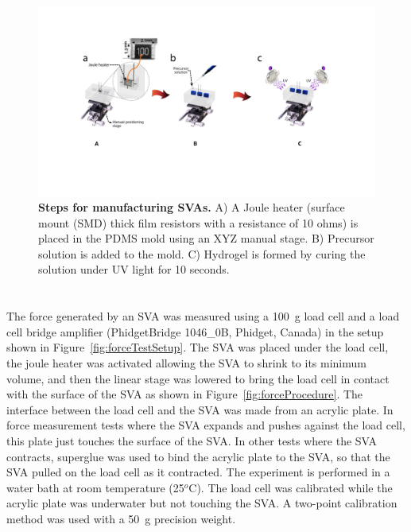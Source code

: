 \begin{figure}[h]
      \centering
      \includegraphics[width=\textwidth]{svaManufacturing.pdf}
      \caption[]{\textbf{Steps for manufacturing SVAs.} A) A Joule heater (surface mount (SMD) thick film resistors with a resistance of 10 ohms) is placed in the PDMS mold using an XYZ manual stage. B) Precursor solution is added to the mold. C) Hydrogel is formed by curing the solution under UV light for 10 seconds.}
      \label{fig:Manufac}
\end{figure}

\section{}
\label{sec:forcemeasur}
The force generated by an SVA was measured using a 100~g load cell and a load cell bridge amplifier (PhidgetBridge 1046_0B, Phidget, Canada) in the setup shown in Figure~\ref{fig:forceTestSetup}. The SVA was placed under the load cell, the joule heater was activated allowing the SVA to shrink to its minimum volume, and then the linear stage was lowered to bring the load cell in contact with the surface of the SVA as shown in Figure~\ref{fig:forceProcedure}. The interface between the load cell and the SVA was made from an acrylic plate. In force measurement tests where the SVA expands and pushes against the load cell, this plate just touches the surface of the SVA. In other tests where the SVA contracts, superglue was used to bind the acrylic plate to the SVA, so that the SVA pulled on the load cell as it contracted. The experiment is performed in a water bath at room temperature (25$^o$C). The load cell was calibrated while the acrylic plate was underwater but not touching the SVA. A two-point calibration method was used with a 50~g precision weight.

